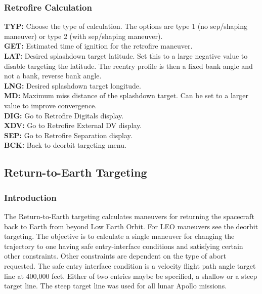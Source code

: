 \documentclass[11pt]{article} %
\begin{document}
\subsubsection{Retrofire Calculation}

\textbf{TYP:} Choose the type of calculation. The options are type 1 (no sep/shaping maneuver) or type 2 (with sep/shaping maneuver).\\
\textbf{GET:} Estimated time of ignition for the retrofire maneuver.\\
\textbf{LAT:} Desired splashdown target latitude. Set this to a large negative value to disable targeting the latitude. The reentry profile is then a fixed bank angle and not a bank, reverse bank angle.\\
\textbf{LNG:} Desired splashdown target longitude.\\
\textbf{MD:} Maximum miss distance of the splashdown target. Can be set to a larger value to improve convergence.\\

\textbf{DIG:} Go to Retrofire Digitals display.\\
\textbf{XDV:} Go to Retrofire External DV display.\\
\textbf{SEP:} Go to Retrofire Separation display.\\
\textbf{BCK:} Back to deorbit targeting menu.\\

\newpage
\subsection{Return-to-Earth Targeting}

\subsubsection{Introduction}

The Return-to-Earth targeting calculates maneuvers for returning the spacecraft back to Earth from beyond Low Earth Orbit. For LEO maneuvers see the deorbit targeting. The objective is to calculate a single maneuver for changing the trajectory to one having safe entry-interface conditions and satisfying certain other constraints. Other constraints are dependent on the type of abort requested. The safe entry interface condition is a velocity flight path angle target line at 400,000 feet. Either of two entries maybe be specified, a shallow or a steep target line. The steep target line was used for all lunar Apollo missions.\\
\end{document}
